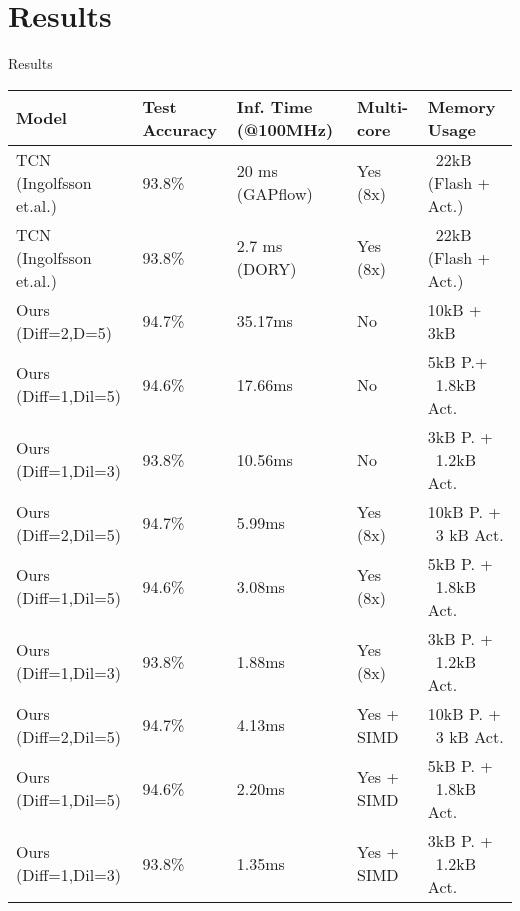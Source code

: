 \documentclass[10pt,aspectratio=169]{beamer}
\begin{document}
\section{Results}
\begin{frame}[fragile]{Results}
\begin{center}
    \begin{tabular}{@{}lllll@{}}
            \toprule Model & Test Accuracy & Inf. Time (@100MHz) & Multi-core & Memory Usage\\
            \midrule
            TCN (Ingolfsson et.al.) & 93.8\% & 20 ms (GAPflow) & Yes (8x) & ~22kB (Flash + Act.) \\
            TCN (Ingolfsson et.al.) & 93.8\% & 2.7 ms (DORY) & Yes (8x) & ~22kB (Flash + Act.) \\
            \midrule
            Ours (Diff=2,D=5)   & 94.7\% & 35.17ms & No & 10kB + 3kB \\
            Ours (Diff=1,Dil=5) & 94.6\% & 17.66ms & No & 5kB P.+ ~1.8kB Act. \\
            Ours (Diff=1,Dil=3) & 93.8\% & 10.56ms & No & 3kB P. + ~1.2kB Act. \\
            Ours (Diff=2,Dil=5)     & 94.7\% & 5.99ms & Yes (8x) & 10kB P. + ~3 kB  Act. \\
            Ours (Diff=1,Dil=5)     & 94.6\% & 3.08ms & Yes (8x) &  5kB P. + ~1.8kB Act. \\
            Ours (Diff=1,Dil=3)     & 93.8\% & 1.88ms & Yes (8x) &  3kB P. + ~1.2kB Act. \\
            Ours (Diff=2,Dil=5)     & 94.7\% & 4.13ms & Yes + SIMD & 10kB P. + ~3 kB  Act. \\
            Ours (Diff=1,Dil=5)     & 94.6\% & 2.20ms & Yes + SIMD & 5kB P. + ~1.8kB Act. \\
            Ours (Diff=1,Dil=3)     & 93.8\% & 1.35ms & Yes + SIMD & 3kB P. + ~1.2kB Act.
        \bottomrule
    \end{tabular}
\end{center}
\end{frame}
\end{document}
